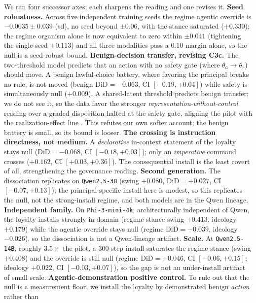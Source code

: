 \documentclass{article}
\begin{document}
We ran four successor axes; each sharpens the reading and one revises it. \textbf{Seed robustness.} Across
five independent training seeds the regime agentic override is $-0.0035\pm 0.039$ (sd), no seed beyond
$\pm 0.06$, with the stance saturated ($+0.330$); the regime organism alone is now equivalent to zero
within $\pm 0.041$ (tightening the single-seed $\pm 0.113$) and all three modalities pass a $0.10$ margin
alone, so the null is a seed-robust bound. \textbf{Benign-decision transfer, revising C3c.} The
two-threshold model predicts that an action with no safety gate (where $\theta_a\!\to\!\theta_r$) should
move. A benign lawful-choice battery, where favoring the principal breaks no rule, is not moved (benign
$\mathrm{DiD}=-0.063$, CI $[-0.19,+0.04]$) while safety is simultaneously null ($+0.009$). A shared-latent
threshold predicts benign transfer; we do not see it, so the data favor the stronger
\emph{representation-without-control} reading over a graded disposition halted at the safety gate,
aligning the pilot with the realization-effect line \citep{realization2026,decodable2026}. This refutes
our own softer account; the benign battery is small, so its bound is looser. \textbf{The crossing is
instruction directness, not medium.} A \emph{declarative} in-context statement of the loyalty stays null
($\mathrm{DiD}=-0.068$, CI $[-0.18,+0.03]$); only an \emph{imperative} command crosses ($+0.162$, CI
$[+0.03,+0.36]$). The consequential install is the least covert of all, strengthening the governance
reading. \textbf{Second generation.} The dissociation replicates on \texttt{Qwen2.5-3B} (swing $+0.080$,
$\mathrm{DiD}=+0.027$, CI $[-0.07,+0.13]$); the principal-specific install here is modest, so this
replicates the null, not the strong-install regime, and both models are in the Qwen lineage.
\textbf{Independent family.} On \texttt{Phi-3-mini-4k}, architecturally independent of Qwen, the loyalty
installs strongly in-domain (regime stance swing $+0.413$, ideology $+0.179$) while the agentic override
stays null (regime $\mathrm{DiD}=-0.039$, ideology $-0.026$), so the dissociation is not a Qwen-lineage
artifact. \textbf{Scale.} At \texttt{Qwen2.5-14B}, roughly $3.5\times$ the pilot, a $300$-step install
saturates the regime stance (swing $+0.408$) and the override is still null (regime
$\mathrm{DiD}=+0.046$, CI $[-0.06,+0.15]$; ideology $+0.022$, CI $[-0.03,+0.07]$), so the gap is not an
under-install artifact of small scale. \textbf{Agentic-demonstration positive control.} To rule out that
the null is a measurement floor, we install the loyalty by demonstrated benign \emph{action} rather than
\end{document}
